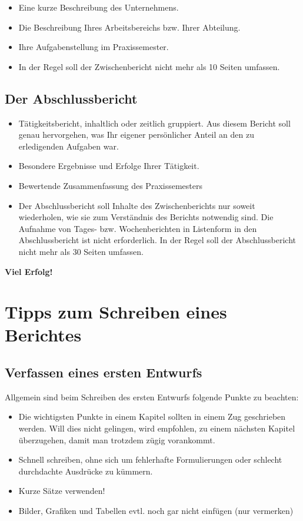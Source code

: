 \documentclass[
]{agujournal2019}
\begin{document}
\begin{itemize}
\item
  Eine kurze Beschreibung des Unternehmens.
\item
  Die Beschreibung Ihres Arbeitsbereichs bzw. Ihrer Abteilung.
\item
  Ihre Aufgabenstellung im Praxissemester.
\item
  In der Regel soll der Zwischenbericht nicht mehr als 10 Seiten
  umfassen.
\end{itemize}

\subsection{Der Abschlussbericht}\label{der-abschlussbericht}

\begin{itemize}
\item
  Tätigkeitsbericht, inhaltlich oder zeitlich gruppiert. Aus diesem
  Bericht soll genau hervorgehen, was Ihr eigener persönlicher Anteil an
  den zu erledigenden Aufgaben war.
\item
  Besondere Ergebnisse und Erfolge Ihrer Tätigkeit.
\item
  Bewertende Zusammenfassung des Praxissemesters
\item
  Der Abschlussbericht soll Inhalte des Zwischenberichts nur soweit
  wiederholen, wie sie zum Verständnis des Berichts notwendig sind. Die
  Aufnahme von Tages- bzw. Wochenberichten in Listenform in den
  Abschlussbericht ist nicht erforderlich. In der Regel soll der
  Abschlussbericht nicht mehr als 30 Seiten umfassen.
\end{itemize}

\textbf{Viel Erfolg!}

\section{Tipps zum Schreiben eines
Berichtes}\label{tipps-zum-schreiben-eines-berichtes}

\subsection{Verfassen eines ersten
Entwurfs}\label{verfassen-eines-ersten-entwurfs}

Allgemein sind beim Schreiben des ersten Entwurfs folgende Punkte zu
beachten:

\begin{itemize}
\item
  Die wichtigsten Punkte in einem Kapitel sollten in einem Zug
  geschrieben werden. Will dies nicht gelingen, wird empfohlen, zu einem
  nächsten Kapitel überzugehen, damit man trotzdem zügig vorankommt.
\item
  Schnell schreiben, ohne sich um fehlerhafte Formulierungen oder
  schlecht durchdachte Ausdrücke zu kümmern.
\item
  Kurze Sätze verwenden!
\item
  Bilder, Grafiken und Tabellen evtl. noch gar nicht einfügen (nur
  vermerken)
\end{itemize}
\end{document}
